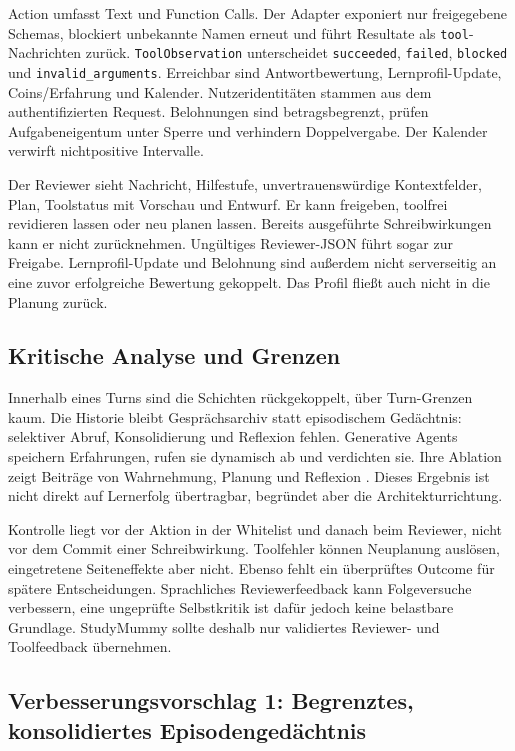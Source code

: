 Action umfasst Text und Function Calls. Der Adapter exponiert nur freigegebene
Schemas, blockiert unbekannte Namen erneut und führt Resultate als
\texttt{tool}-Nachrichten zurück. \texttt{ToolObservation} unterscheidet
\texttt{succeeded}, \texttt{failed}, \texttt{blocked} und
\texttt{invalid\_arguments}. Erreichbar sind Antwortbewertung,
Lernprofil-Update, Coins/Erfahrung und Kalender. Nutzeridentitäten stammen aus
dem authentifizierten Request. Belohnungen sind betragsbegrenzt, prüfen
Aufgabeneigentum unter Sperre und verhindern Doppelvergabe. Der Kalender
verwirft nichtpositive Intervalle.

Der Reviewer sieht Nachricht, Hilfestufe, unvertrauenswürdige Kontextfelder,
Plan, Toolstatus mit Vorschau und Entwurf. Er kann freigeben, toolfrei revidieren
lassen oder neu planen lassen. Bereits ausgeführte Schreibwirkungen kann er
nicht zurücknehmen. Ungültiges Reviewer-JSON führt sogar zur Freigabe.
Lernprofil-Update und Belohnung sind außerdem nicht serverseitig an eine zuvor
erfolgreiche Bewertung gekoppelt. Das Profil fließt auch nicht in die Planung
zurück.

\subsection{Kritische Analyse und Grenzen}

Innerhalb eines Turns sind die Schichten rückgekoppelt, über Turn-Grenzen kaum.
Die Historie bleibt Gesprächsarchiv statt episodischem Gedächtnis: selektiver
Abruf, Konsolidierung und Reflexion fehlen. Generative Agents speichern
Erfahrungen, rufen sie dynamisch ab und verdichten sie. Ihre Ablation zeigt
Beiträge von Wahrnehmung, Planung und Reflexion \parencite{parkEtAl2023}. Dieses
Ergebnis ist nicht direkt auf Lernerfolg übertragbar, begründet aber die
Architekturrichtung.

Kontrolle liegt vor der Aktion in der Whitelist und danach beim Reviewer, nicht
vor dem Commit einer Schreibwirkung. Toolfehler können Neuplanung auslösen,
eingetretene Seiteneffekte aber nicht. Ebenso fehlt ein überprüftes Outcome für
spätere Entscheidungen. Sprachliches Reviewerfeedback kann Folgeversuche
verbessern, eine ungeprüfte Selbstkritik ist dafür jedoch keine belastbare
Grundlage. StudyMummy sollte deshalb nur validiertes Reviewer- und Toolfeedback
übernehmen.

\subsection{Verbesserungsvorschlag 1: Begrenztes, konsolidiertes Episodengedächtnis}
\label{sec:verbesserung-eins}

